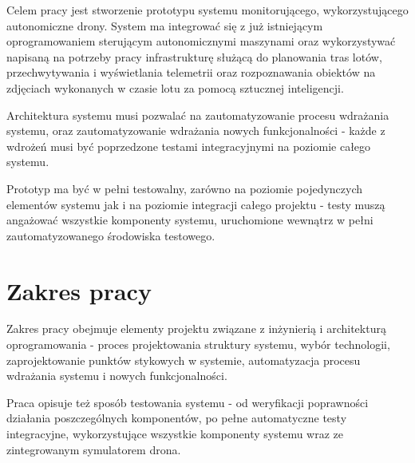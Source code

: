 Celem pracy jest stworzenie prototypu systemu monitorującego, wykorzystującego
autonomiczne drony. System ma integrować się z już istniejącym oprogramowaniem
sterującym autonomicznymi maszynami oraz wykorzystywać napisaną na potrzeby pracy
infrastrukturę służącą do planowania tras lotów, przechwytywania i wyświetlania
telemetrii oraz rozpoznawania obiektów na zdjęciach wykonanych w czasie lotu za
pomocą sztucznej inteligencji.

Architektura systemu musi pozwalać na zautomatyzowanie procesu wdrażania
systemu, oraz zautomatyzowanie wdrażania nowych funkcjonalności - każde
z wdrożeń musi być poprzedzone testami integracyjnymi na poziomie całego systemu. 

Prototyp ma być w pełni testowalny, zarówno na poziomie pojedynczych
elementów systemu jak i na poziomie integracji całego projektu - testy muszą
angażować wszystkie komponenty systemu, uruchomione wewnątrz w pełni
zautomatyzowanego środowiska testowego.

\section{Zakres pracy}

Zakres pracy obejmuje elementy projektu związane z
inżynierią i architekturą oprogramowania - proces projektowania struktury systemu,
wybór technologii, zaprojektowanie punktów stykowych w systemie, automatyzacja
procesu wdrażania systemu i nowych funkcjonalności.

Praca opisuje też sposób testowania systemu - od weryfikacji poprawności działania poszczególnych
komponentów, po pełne automatyczne testy integracyjne, wykorzystujące wszystkie
komponenty systemu wraz ze zintegrowanym symulatorem drona. 
